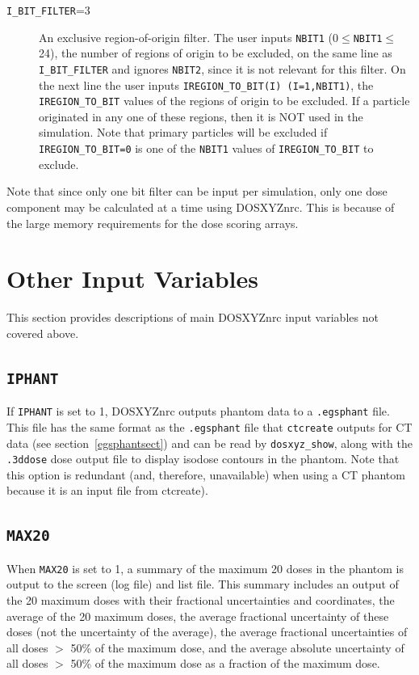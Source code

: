\documentclass[12pt,twoside]{article}      %
\newcommand{\indexm}[1]{\index{#1}}
\begin{document}
\begin{description}
\item [{\tt I\_BIT\_FILTER}=3] An exclusive region-of-origin filter.
The user inputs {\tt NBIT1} (0$\leq${\tt NBIT1}$\leq$24), the number of
regions of origin to be excluded, on the same line as {\tt I\_BIT\_FILTER} and
ignores {\tt NBIT2}, since it is not relevant for this filter.  On the
next line the user inputs {\tt IREGION\_TO\_BIT(I) (I=1,NBIT1)}, the
{\tt IREGION\_TO\_BIT} values of the regions of origin to be excluded.
If a particle originated in any one of these regions, then it is NOT
used in the simulation.  Note that primary particles will be excluded if
{\tt IREGION\_TO\_BIT=0} is one of the {\tt NBIT1} values of
{\tt IREGION\_TO\_BIT} to exclude.

\end{description}

Note that since only one bit filter can be input per simulation, only one
dose component may be calculated at a time using DOSXYZnrc.  This is because
of the large memory requirements for the dose scoring arrays.

\section{Other Input Variables}

This section provides descriptions of main DOSXYZnrc input variables not
covered above.

\vspace*{-0.5cm}
\subsection{{\tt IPHANT}}
\label{iphantsect}
\indexm{IPHANT}

If {\tt IPHANT} is set to 1, DOSXYZnrc outputs phantom data to
a {\tt .egsphant} file.  This file has the same format as the
{\tt .egsphant} file that {\tt ctcreate} outputs for CT data
(see section~\ref{egsphantsect}) and can be read by
{\tt dosxyz\_show}\cite{Ka98},
along with the {\tt .3ddose} dose output file to display isodose contours in
the phantom.  Note that this option is redundant (and, therefore, unavailable)
when using a CT phantom because it is an input file from ctcreate).

\subsection{{\tt MAX20}}
\indexm{MAX20}
\label{MAX20description}

When {\tt MAX20} is set to 1, a summary of the maximum 20 doses in the
phantom is output to the screen (log file) and list file.  This summary
includes an output of the 20 maximum doses with their fractional
uncertainties and coordinates, the average of the 20 maximum doses, the average
fractional uncertainty of these doses (not the uncertainty of the average), the
average fractional uncertainties of all doses $>$ 50\% of the maximum dose,
and the average absolute uncertainty of all doses $>$ 50\% of the maximum dose
as a fraction of the maximum dose.
\end{document}
